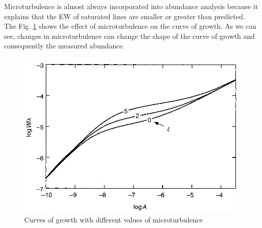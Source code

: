 \documentclass[dvips,12pt,a4paper]{report}
\begin{document}
{Microturbulence is almost always incorporated into abundance analysis because it explains that the EW of saturated lines are smaller or greater than predicted. The Fig. \ref{microturb} shows the effect of microturbulence on the curve of growth. As we can see, changes in microturbulence can change the shape of the curve of growth and consequently the measured abundance.



\begin{figure}[h]
\centering
\includegraphics[height=5 cm]{pics/parte2/vtur.eps}
\caption[Curve of growth with different values of microturbulence] {Curves of growth with different values of microturbulence}
\label{microturb}
\end{figure}







}
\end{document}
